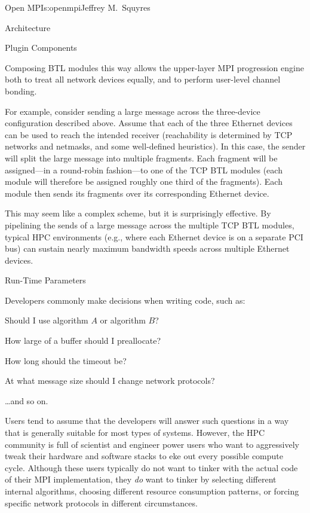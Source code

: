 \begin{aosachapter}{Open MPI}{s:openmpi}{Jeffrey M.\ Squyres}
\begin{aosasect1}{Architecture}
\begin{aosasect2}{Plugin Components}

Composing BTL modules this way allows the upper-layer MPI progression
engine both to treat all network devices equally, and to perform
user-level channel bonding.  

For example, consider sending a large message across the three-device
configuration described above.  Assume that each of the three Ethernet
devices can be used to reach the intended receiver (reachability is
determined by TCP networks and netmasks, and some well-defined
heuristics).
%
In this case, the sender will split the large message into multiple
fragments.  Each fragment will be assigned---in a round-robin
fashion---to one of the TCP BTL modules (each module will therefore be
assigned roughly one third of the fragments).
%
Each module then sends its fragments over its corresponding Ethernet
device.

This may seem like a complex scheme, but it is surprisingly
effective.  
%
By pipelining the sends of a large message across the multiple TCP BTL
modules, typical HPC environments (e.g., where each Ethernet device is
on a separate PCI bus) can sustain nearly maximum bandwidth speeds
across multiple Ethernet devices.

\end{aosasect2}


\begin{aosasect2}{Run-Time Parameters}

Developers commonly make decisions when writing code, such as:

\begin{aosaitemize}
\item Should I use algorithm $A$ or algorithm $B$?
\item How large of a buffer should I preallocate?
\item How long should the timeout be?
\item At what message size should I change network protocols?
\item {\ldots}and so on.
\end{aosaitemize}

Users tend to assume that the developers will answer such questions in
a way that is generally suitable for most types of systems.
%
However, the HPC community is full of scientist and engineer power
users who want to aggressively tweak their hardware and software
stacks to eke out every possible compute cycle.
%
Although these users typically do not want to tinker with the actual
code of their MPI implementation, they \emph{do} want to tinker by
selecting different internal algorithms, choosing different resource
consumption patterns, or forcing specific network protocols in
different circumstances.


\end{aosasect2}
\end{aosasect1}
\end{aosachapter}
